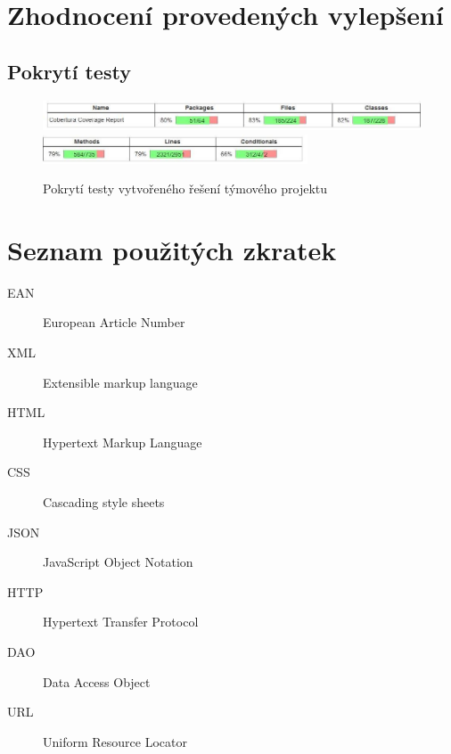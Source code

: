 \documentclass[thesis=B,czech]{FITthesis}[2012/06/26]
\begin{document}
\chapter{Zhodnocení provedených vylepšení}


\section{Pokrytí testy}
\begin{figure}[h]\centering
 	\includegraphics[width=1.0\textwidth]{resources/cobertura-report-new-1}
 	\includegraphics[width=0.7\textwidth]{resources/cobertura-report-new-2}
	\caption[Pokrytí testy po provedených vylepšení]{Pokrytí testy vytvořeného řešení týmového projektu}\label{fig:cober-new}
\end{figure}


\begin{conclusion}
\end{conclusion}





\appendix
\chapter{Seznam použitých zkratek}
\begin{description}
	\item[EAN] European Article Number
	\item[XML] Extensible markup language
	\item[HTML] Hypertext Markup Language
	\item[CSS] Cascading style sheets
	\item[JSON] JavaScript Object Notation
	\item[HTTP] Hypertext Transfer Protocol
	\item[DAO] Data Access Object
	\item[URL] Uniform Resource Locator

\end{description}
\end{document}
